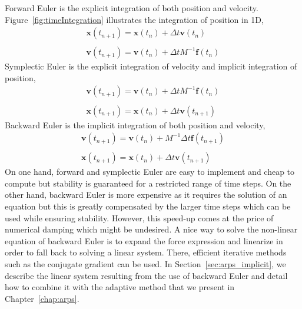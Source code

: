 Forward Euler is the explicit integration of both position and velocity.
Figure~\ref{fig:timeIntegration} illustrates the integration of position in 1D,
\begin{equation}
\label{eq:explicitEuler}
\begin{array}{l}
\displaystyle \mathbf{x}(t_{n+1}) = \mathbf{x}(t_{n}) + \Delta t \mathbf{v}(t_{n}) \\ \\
\displaystyle \mathbf{v}(t_{n+1}) = \mathbf{v}(t_{n}) + \Delta t M^{-1}\mathbf{f}(t_{n})
\end{array}
\end{equation}
Symplectic Euler is the explicit integration of velocity and implicit integration of position,
\begin{equation}
\label{eq:symplecticEuler}
\begin{array}{l}
\displaystyle \mathbf{v}(t_{n+1}) = \mathbf{v}(t_{n}) + \Delta t M^{-1} \mathbf{f}(t_{n}) \\ \\
\displaystyle \mathbf{x}(t_{n+1}) = \mathbf{x}(t_{n}) + \Delta t \mathbf{v}(t_{n+1})
\end{array}
\end{equation}
Backward Euler is the implicit integration of both position and velocity,
\begin{equation}
\label{eq:backwardEuler}
\begin{array}{ll}
\displaystyle \mathbf{v}(t_{n+1}) = \mathbf{v}(t_{n}) + M^{-1}\Delta t \mathbf{f}(t_{n+1}) \\ \\
\displaystyle \mathbf{x}(t_{n+1}) = \mathbf{x}(t_{n}) + \Delta t \mathbf{v}(t_{n+1})
\end{array}
\end{equation}
On one hand, forward and symplectic Euler are easy to implement and cheap to compute but stability is guaranteed for a restricted range of time steps. 
On the other hand, backward Euler is more expensive as it requires the solution of an equation but this is greatly compensated by the larger time steps which can be used while ensuring stability.
However, this speed-up comes at the price of numerical damping which might be undesired.
A nice way to solve the non-linear equation of backward Euler is to expand the force expression and linearize in order to fall back to solving a linear system. There, efficient iterative methods such as the conjugate gradient can be used.
In Section~\ref{sec:arps_implicit}, we describe the linear system resulting from the use of backward Euler and detail how to combine it with the adaptive method that we present in Chapter~\ref{chap:arps}.

